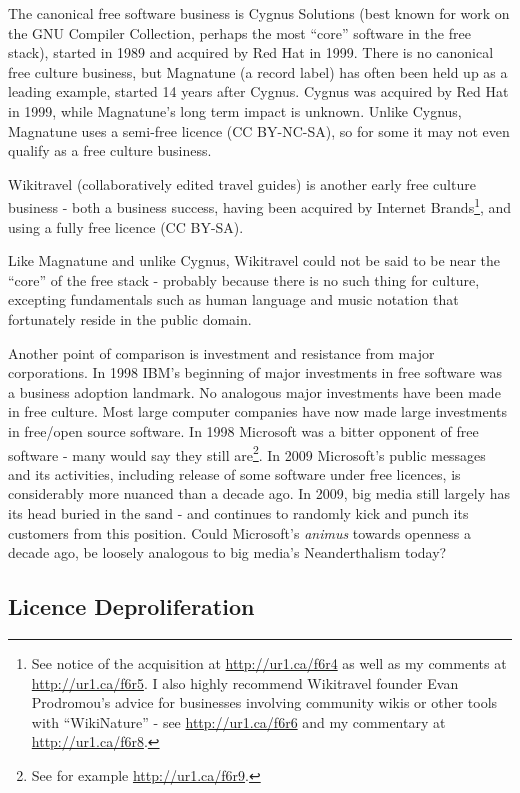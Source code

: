 The canonical free software business is Cygnus Solutions (best known for work on
the GNU Compiler Collection, perhaps the most ``core'' software in the free
stack), started in 1989 and acquired by Red Hat in 1999. There is no canonical
free culture business, but Magnatune (a record label) has often been held up as
a leading example, started 14 years after Cygnus. Cygnus was acquired by Red Hat
in 1999, while Magnatune's long term impact is unknown. Unlike Cygnus, Magnatune
uses a semi-free licence (CC BY-NC-SA), so for some it may not even qualify as a
free culture business.

Wikitravel (collaboratively edited travel guides) is another early free culture
business - both a business success, having been acquired by Internet
Brands\footnote{See notice of the acquisition at \url{http://ur1.ca/f6r4} as
well as my comments at \url{http://ur1.ca/f6r5}. I also highly recommend
Wikitravel founder Evan Prodromou's advice for businesses involving community
wikis or other tools with ``WikiNature'' - see \url{http://ur1.ca/f6r6} and my
commentary at \url{http://ur1.ca/f6r8}.}, and using a fully free licence (CC
BY-SA).

Like Magnatune and unlike Cygnus, Wikitravel could not be said to be near the
``core'' of the free stack - probably because there is no such thing for
culture, excepting fundamentals such as human language and music notation that
fortunately reside in the public domain.

Another point of comparison is investment and resistance from major
corporations. In 1998 IBM's beginning of major investments in free software was
a business adoption landmark. No analogous major investments have been made in
free culture. Most large computer companies have now made large investments in
free/open source software. In 1998 Microsoft was a bitter opponent of free
software - many would say they still are\footnote{See for example
\url{http://ur1.ca/f6r9}.}. In 2009
Microsoft's public messages and its activities, including release of some
software under free licences, is considerably more nuanced than a decade ago. In
2009, big media still largely has its head buried in the sand - and continues to
randomly kick and punch its customers from this position. Could Microsoft's
\textit{animus} towards openness a decade ago, be loosely analogous to big
media's Neanderthalism today?


\subsection{Licence Deproliferation}
\label{s:free_culture_software_freedom:relative_progress:licence_deproliferation}


